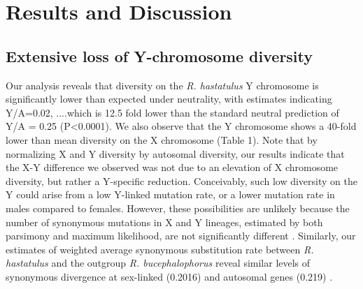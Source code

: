 \documentclass[9pt,twocolumn,twoside]{gsajnl}
\begin{document}
\section*{Results and Discussion}

\subsection*{Extensive loss of Y-chromosome diversity}
Our analysis reveals that diversity on the \textit{R. hastatulus} Y chromosome is significantly lower than expected under neutrality, with estimates indicating Y/A=0.02, ....which is 12.5 fold lower than the standard neutral prediction of Y/A = 0.25 (P<0.0001). We also observe that the Y chromosome shows a 40-fold lower than mean diversity on the X chromosome (Table 1). Note that by normalizing X and Y diversity by autosomal diversity, our results indicate that the X-Y difference we observed was not due to an elevation of X chromosome diversity, but rather a Y-specific reduction. Conceivably, such low diversity on the Y could arise from a low Y-linked mutation rate, or a lower mutation rate in males compared to females. However, these possibilities are unlikely because the number of synonymous mutations in X and Y lineages, estimated by both parsimony and maximum likelihood, are not significantly different \citep{hough2014}. Similarly, our estimates of weighted average synonymous substitution rate between \textit{R. hastatulus} and the outgroup \textit{R. bucephalophorus} reveal similar levels of synonymous divergence at sex-linked (0.2016) and autosomal genes (0.219) \citep{hough2014}.


\end{document}

